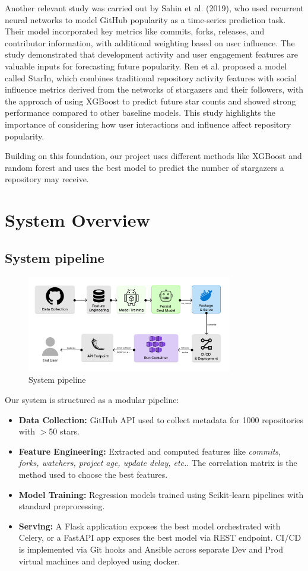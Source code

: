 \documentclass[12pt,a4paper]{article}
\begin{document}
Another relevant study was carried out by Sahin et al. (2019),\cite{4} who used recurrent neural networks to model GitHub popularity as a time-series prediction task. Their model incorporated key metrics like commits, forks, releases, and contributor information, with additional weighting based on user influence. The study demonstrated that development activity and user engagement features are valuable inputs for forecasting future popularity. Ren et al.\cite{2} proposed a model called StarIn, which combines traditional repository activity features with social influence metrics derived from the networks of stargazers and their followers, with the approach of using XGBoost to predict future star counts and showed strong performance compared to other baseline models. This study highlights the importance of considering how user interactions and influence affect repository popularity.

Building on this foundation, our project uses different methods like XGBoost and random forest and uses the best model to predict the number of stargazers a repository may receive. 

\section{System Overview}
\subsection{System pipeline}
\begin{figure}[H]
  \centering
  \includegraphics[width=0.8\textwidth]{Architecture.png}
  \caption{System pipeline}
  \label{fig:my-image}
\end{figure}
Our system is structured as a modular pipeline:
\begin{itemize}
    \item \textbf{Data Collection:} GitHub API used to collect metadata for 1000 repositories with $>$50 stars.
    \item \textbf{Feature Engineering:} Extracted and computed features like \textit{commits, forks, watchers, project age, update delay, etc.}. The correlation matrix is the method used to choose the best features.
    \item \textbf{Model Training:} Regression models trained using Scikit-learn pipelines with standard preprocessing.
    \item \textbf{Serving:} A Flask application exposes the best model orchestrated with Celery, or a FastAPI app exposes the best model via REST endpoint. CI/CD is implemented via Git hooks and Ansible across separate Dev and Prod virtual machines and deployed using docker.
\end{itemize}
\end{document}
